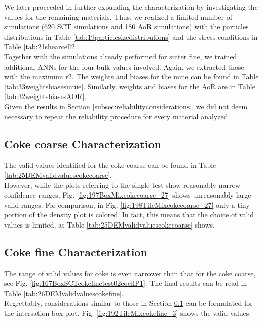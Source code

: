 We later proceeded in further expanding the characterization by investigating
the values for the remaining materials.
Thus, we realized a limited number of simulations (620 \acs{SCT} simulations
and 180 \acs{AoR} simulations) with the particles distributions in Table
\ref{tab:19particlesizedistributions} and the stress conditions in Table
\ref{tab:21shearcell2}.\\
Together with the simulations already performed for sinter fine, we trained
additional \acs{ANNs} for the four bulk values involved.
Again, we extracted those with the maximum \acs{r2}.
The weights and biases for the \acs{muie} can be found in Table
\ref{tab:33weightsbiasesmuie}.
Similarly, weights and biases for the \acs{AoR} are in Table
\ref{tab:32weightsbiasesAOR}.\\
Given the results in Section \ref{subsec:reliabilityconsiderations}, we did not
deem necessary to repeat the reliability procedure for every material analyzed.





\subsection{Coke coarse Characterization}
\label{subsec:cokecoarsecharacterization}

The valid values identified for the coke coarse can be found in Table
\ref{tab:25DEMvalidvaluescokecoarse}.\\
However, while the plots referring to the single test show reasonably narrow
confidence ranges, Fig. \ref{fig:197BoxMixcokecoarse_27} shows unreasonably
large valid ranges.
For comparison, in Fig. \ref{fig:198TileMixcokecoarse_27} only a tiny portion of
the density plot is colored.
In fact, this means that the choice of valid values is limited, as Table
\ref{tab:25DEMvalidvaluescokecoarse} shows.


%


\subsection{Coke fine Characterization}
\label{subsec:cokefinecharacterization}

The range of valid values for coke is even narrower than that for the coke
coarse, see Fig. \ref{fig:167BoxSCTcokefinetest02coeffP1}.
The final results can be read in Table \ref{tab:26DEMvalidvaluescokefine}.\\
Regrettably, considerations similar to those in Section
\ref{subsec:cokecoarsecharacterization} can be formulated for the intersation
box plot.
Fig. \ref{fig:192TileMixcokefine_3} shows the valid values.

